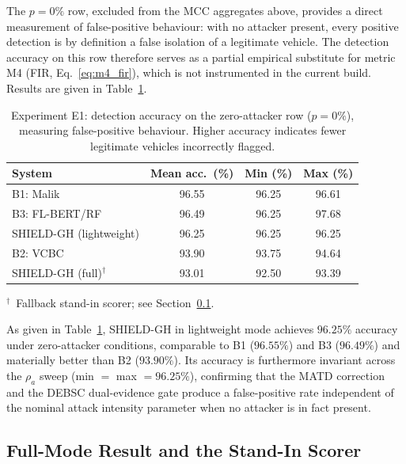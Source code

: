 \documentclass[12pt, a4paper]{report}
\begin{document}
The $p=0\%$ row, excluded from the MCC aggregates above, provides a
direct measurement of false-positive behaviour: with no attacker present,
every positive detection is by definition a false isolation of a
legitimate vehicle. The detection accuracy on this row therefore serves
as a partial empirical substitute for metric M4 (FIR,
Eq.~\eqref{eq:m4_fir}), which is not instrumented in the current build.
Results are given in Table~\ref{tab:e1_fp}.

\begin{table}[H]
\renewcommand{\arraystretch}{1.25}
\caption{Experiment E1: detection accuracy on the zero-attacker row
($p=0\%$), measuring false-positive behaviour. Higher accuracy
indicates fewer legitimate vehicles incorrectly flagged.}
\label{tab:e1_fp}
\centering
\small
\begin{tabular}{|l|c|c|c|}
\hline
\textbf{System} & \textbf{Mean acc.\ (\%)} &
\textbf{Min (\%)} & \textbf{Max (\%)} \\
\hline
B1: Malik~\cite{malik2023greyhole} & 96.55 & 96.25 & 96.61 \\
\hline
B3: FL-BERT/RF~\cite{ahsan2024flbert} & 96.49 & 96.25 & 97.68 \\
\hline
SHIELD-GH (lightweight) & 96.25 & 96.25 & 96.25 \\
\hline
B2: VCBC~\cite{alabdulatif2024mitigating} & 93.90 & 93.75 & 94.64 \\
\hline
SHIELD-GH (full)$^{\dagger}$ & 93.01 & 92.50 & 93.39 \\
\hline
\end{tabular}
\vspace{1mm}

\footnotesize{$^{\dagger}$~Fallback stand-in scorer; see
Section~\ref{subsec:e1_fullmode}.}
\end{table}

As given in Table~\ref{tab:e1_fp}, SHIELD-GH in lightweight mode achieves
$96.25\%$ accuracy under zero-attacker conditions, comparable to B1
($96.55\%$) and B3 ($96.49\%$) and materially better than B2 ($93.90\%$).
Its accuracy is furthermore invariant across the $\rho_a$ sweep
(min $=$ max $=96.25\%$), confirming that the MATD correction and the
DEBSC dual-evidence gate produce a false-positive rate independent of
the nominal attack intensity parameter when no attacker is in fact
present.

\subsection{Full-Mode Result and the Stand-In Scorer}
\label{subsec:e1_fullmode}
\end{document}
